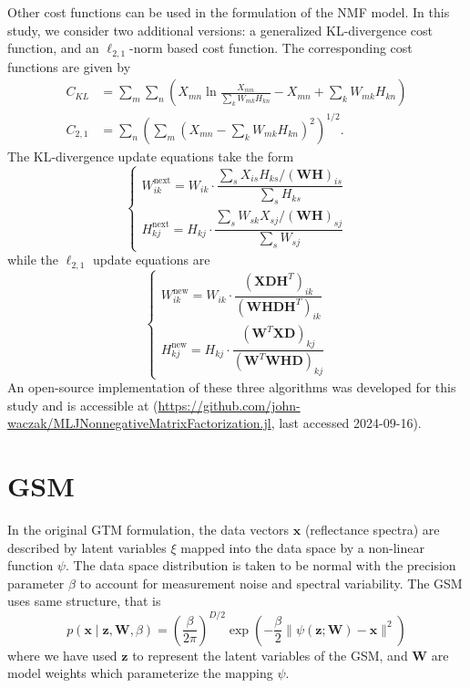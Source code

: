Other cost functions can be used in the formulation of the NMF model. In this
study, we consider two additional versions: a generalized KL-divergence cost
function, and an $\ell_{2,1}$-norm based cost function. The corresponding cost
functions are given by
\begin{align}
  C_{KL} &= \sum_m\sum_n\left( X_{mn}\ln\frac{X_{mn}}{\sum_kW_{mk}H_{kn}} - X_{mn} + \sum_kW_{mk}H_{kn} \right) \\
  C_{2,1} &= \sum_n\left( \sum_m \left( X_{mn} - \sum_k W_{mk}H_{kn} \right)^2 \right)^{1/2}.
\end{align}
The KL-divergence update equations take the form
\begin{equation}
  \begin{cases}
    W^{\text{next}}_{ik} = W_{ik} \cdot \dfrac{\sum_s X_{is}H_{ks}/(\mathbf{W}\mathbf{H})_{is}}{\sum_s H_{ks}} \\
    H^{\text{next}}_{kj} = H_{kj} \cdot \dfrac{\sum_s W_{sk}X_{sj}/(\mathbf{W}\mathbf{H})_{sj}}{\sum_sW_{sj}}
  \end{cases}
\end{equation}
while the $\ell_{2,1}$ update equations are
\begin{equation}
  \begin{cases}
    W^{\text{new}}_{ik} = W_{ik} \cdot \dfrac{(\mathbf{X}\mathbf{D}\mathbf{H}^T)_{ik}}{(\mathbf{W}\mathbf{H}\mathbf{D}\mathbf{H}^T)_{ik}} \\
    H^{\text{new}}_{kj} = H_{kj} \cdot \dfrac{(\mathbf{W}^T\mathbf{X}\mathbf{D})_{kj}}{(\mathbf{W}^T\mathbf{W}\mathbf{H}\mathbf{D})_{kj}}
  \end{cases}
\end{equation}
An open-source implementation of these three algorithms was developed for this study and is
accessible at
(\url{https://github.com/john-waczak/MLJNonnegativeMatrixFactorization.jl}, last
accessed 2024-09-16).

\section{GSM}

In the original GTM formulation, the data vectors $\mathbf{x}$ (reflectance spectra) are
described by latent variables $\xi$ mapped into the data space by a non-linear
function $\psi$. The data space distribution is taken to be normal with the
precision parameter $\beta$ to account for measurement noise and spectral
variability. The GSM uses same structure, that is
\begin{equation}\label{eqn:data-space-distribution}
    p(\mathbf{x} \mid \mathbf{z}, \mathbf{W}, \beta) = \left(\frac{\beta}{2\pi} \right)^{D/2}\exp\left( -\frac{\beta}{2}\lVert \psi(\mathbf{z}; \mathbf{W}) - \mathbf{x} \rVert^2 \right)
\end{equation}
where we have used $\mathbf{z}$ to represent the latent variables of the GSM, and
$\mathbf{W}$ are model weights which parameterize the mapping $\psi$.

